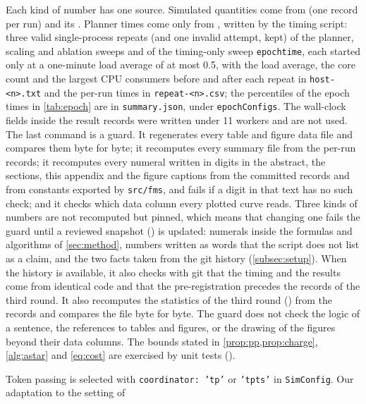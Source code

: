 \begin{sloppypar}
Each kind of number has one source. Simulated quantities come from
 (one record per run) and
its . Planner times come only from
, written by the timing
script: three valid single-process repeats (and one invalid attempt, kept) of the planner, scaling and ablation
sweeps and of the timing-only sweep \texttt{epochtime}, each started only at a one-minute load average of at most 0.5, with
the load average, the core count and the largest CPU consumers before and
after each repeat in \texttt{host-<n>.txt} and the per-run times in
\texttt{repeat-<n>.csv}; the percentiles of the epoch times in \cref{tab:epoch} are in
\texttt{summary.json}, under \texttt{epochConfigs}. The wall-clock fields inside the result records
were written under 11 workers and are not used. The last command is a guard.
It regenerates every table and figure data file and compares them byte for
byte; it recomputes every summary file from the per-run records; it
recomputes every numeral written in digits in the abstract, the sections,
this appendix and the figure captions from the committed records and from
constants exported by \texttt{src/fms}, and fails if a digit in that text
has no such check; and it checks which data column every plotted curve
reads. Three kinds of numbers are not recomputed but pinned, which means
that changing one fails the guard until a reviewed snapshot
() is updated: numerals inside the
formulas and algorithms of \cref{sec:method}, numbers written as words
that the script does not list as a claim, and the two facts taken from the
git history (\cref{subsec:setup}). When the history is available, it also checks
with git that the timing and the results come from identical code and that the
pre-registration precedes the records of the third round. It also recomputes the
statistics of the third round () from the
records and compares the file byte for byte. The guard does not check the logic of a
sentence, the references to tables and figures, or the drawing of the
figures beyond their data columns. The bounds stated in
\cref{prop:pp,prop:charge}, \cref{alg:astar} and \cref{eq:cost} are
exercised by unit tests ().
\end{sloppypar}
Token passing is selected with \texttt{coordinator: 'tp'} or
\texttt{'tpts'} in \texttt{SimConfig}. Our adaptation to the setting of
